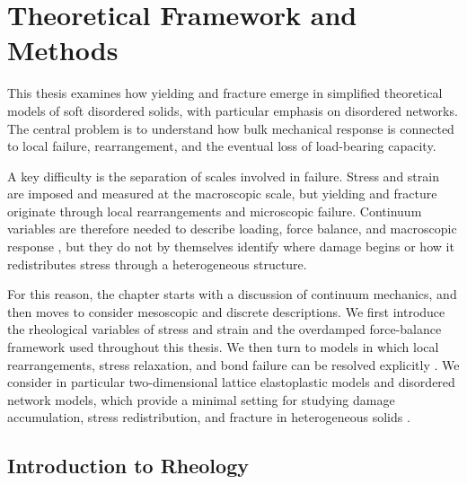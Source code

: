 
\setcounter{equation}{0}
\chapter{Theoretical Framework and Methods} \label{sec:Background}

This thesis examines how yielding and fracture emerge in simplified theoretical models of soft disordered solids, with particular emphasis on disordered networks. The central problem is to understand how bulk mechanical response is connected to local failure, rearrangement, and the eventual loss of load-bearing capacity.

A key difficulty is the separation of scales involved in failure. Stress and strain are imposed and measured at the macroscopic scale, but yielding and fracture originate through local rearrangements and microscopic failure. Continuum variables are therefore needed to describe loading, force balance, and macroscopic response \cite{chandrasekharaiahContinuumMechanics2014,lubliner2008plasticity,macoskoRheologyPrinciplesMeasurements1994}, but they do not by themselves identify where damage begins or how it redistributes stress through a heterogeneous structure.

For this reason, the chapter starts with a discussion of continuum mechanics, and then moves to consider mesoscopic and discrete descriptions. We first introduce the rheological variables of stress and strain and the overdamped force-balance framework used throughout this thesis. We then turn to models in which local rearrangements, stress relaxation, and bond failure can be resolved explicitly \cite{falk_dynamics_1998,maloney_amorphous_2006,tanguy_plastic_2006,gartner_nonlinear_2016,picard_elastic_2004}. We consider in particular two-dimensional lattice elastoplastic models and disordered network models, which provide a minimal setting for studying damage accumulation, stress redistribution, and fracture in heterogeneous solids \cite{mackintosh_elasticity_1995,storm_nonlinear_2005,broedersz_modeling_2014,broedersz_criticality_2011,feng_nonlinear_2016,tauber_stretchy_2022}.

\section{Introduction to Rheology} \label{sec:IntroRheology}

